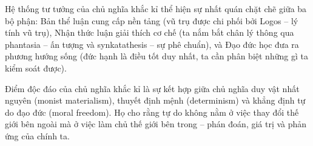 Hệ thống tư tưởng của chủ nghĩa khắc kỉ thể hiện sự nhất quán chặt chẽ giữa ba bộ phận: Bản thể luận cung cấp nền tảng (vũ trụ được chi phối bởi Logos – lý tính vũ trụ), Nhận thức luận giải thích cơ chế (ta nắm bắt chân lý thông qua phantasia – ấn tượng và synkatathesis – sự phê chuẩn), và Đạo đức học đưa ra phương hướng sống (đức hạnh là điều tốt duy nhất, ta cần phân biệt những gì ta kiểm soát được).

Điểm độc đáo của chủ nghĩa khắc kỉ là sự kết hợp giữa chủ nghĩa duy vật nhất nguyên (monist materialism), thuyết định mệnh (determinism) và khẳng định tự do đạo đức (moral freedom). Họ cho rằng tự do không nằm ở việc thay đổi thế giới bên ngoài mà ở việc làm chủ thế giới bên trong – phán đoán, giá trị và phản ứng của chính ta.
